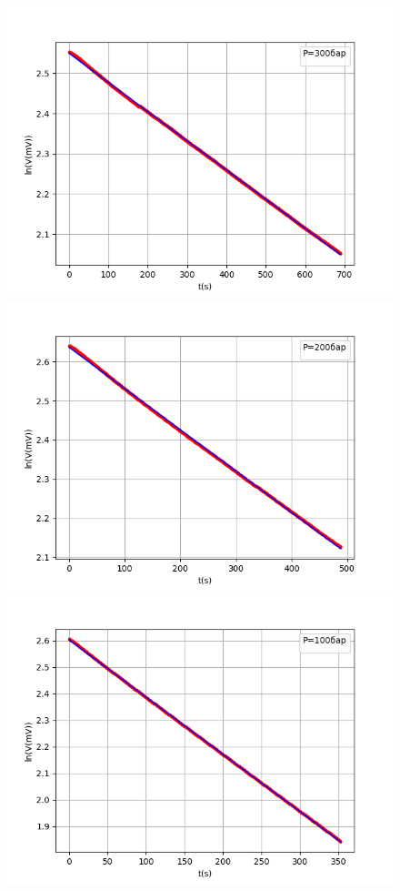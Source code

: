 \documentclass[a4paper,12pt]{article}
\theoremstyle{definition}
\begin{document}
\begin{enumerate}
			
			\begin{figure}[h!]
				\centering
				\includegraphics[scale=0.542]{-0.000727.png}
	                \includegraphics[scale=0.542]{-0.001056.png}
	                \includegraphics[scale=0.542]{-0.002154.png}

\end{figure}
\end{enumerate}
\end{document}
